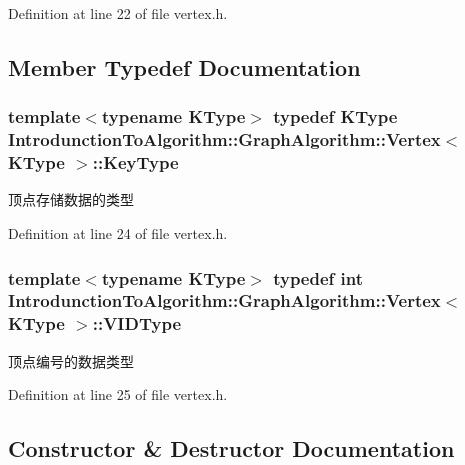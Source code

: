 Definition at line 22 of file vertex.\+h.



\subsection{Member Typedef Documentation}
\hypertarget{struct_introdunction_to_algorithm_1_1_graph_algorithm_1_1_vertex_ada86f69d9e5f5dcb47b7be1e3a208d06}{}
\subsubsection[{Key\+Type}]{\setlength{\rightskip}{0pt plus 5cm}template$<$typename K\+Type$>$ typedef K\+Type {\bf Introdunction\+To\+Algorithm\+::\+Graph\+Algorithm\+::\+Vertex}$<$ K\+Type $>$\+::{\bf Key\+Type}}\label{struct_introdunction_to_algorithm_1_1_graph_algorithm_1_1_vertex_ada86f69d9e5f5dcb47b7be1e3a208d06}
顶点存储数据的类型 

Definition at line 24 of file vertex.\+h.

\hypertarget{struct_introdunction_to_algorithm_1_1_graph_algorithm_1_1_vertex_ac1913974a4b8371c5a896b098ebf152e}{}
\subsubsection[{V\+I\+D\+Type}]{\setlength{\rightskip}{0pt plus 5cm}template$<$typename K\+Type$>$ typedef int {\bf Introdunction\+To\+Algorithm\+::\+Graph\+Algorithm\+::\+Vertex}$<$ K\+Type $>$\+::{\bf V\+I\+D\+Type}}\label{struct_introdunction_to_algorithm_1_1_graph_algorithm_1_1_vertex_ac1913974a4b8371c5a896b098ebf152e}
顶点编号的数据类型 

Definition at line 25 of file vertex.\+h.



\subsection{Constructor \& Destructor Documentation}
\hypertarget{struct_introdunction_to_algorithm_1_1_graph_algorithm_1_1_vertex_ac4aef8b9a11955883ec6f3d3d80d0c8d}{}
